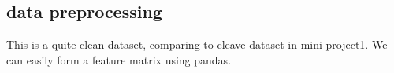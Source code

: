 \subsection{data preprocessing}
This is a quite clean dataset, comparing to cleave dataset in mini-project1. We can easily form a feature matrix using pandas.\\